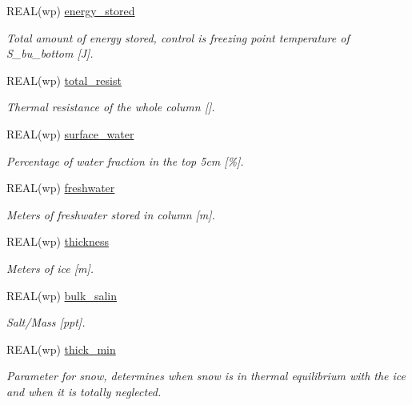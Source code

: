 \begin{DoxyCompactItemize}
REAL(wp) \hyperlink{namespacemo__data_aedd9ec4adc59bfcbf90402c4226f2f34}{energy\_\-stored}
\begin{DoxyCompactList}\small\item\em Total amount of energy stored, control is freezing point temperature of S\_\-bu\_\-bottom \mbox{[}J\mbox{]}. \item\end{DoxyCompactList}\item 
REAL(wp) \hyperlink{namespacemo__data_a71a192f5750717bc71df8f87c2a8cf52}{total\_\-resist}
\begin{DoxyCompactList}\small\item\em Thermal resistance of the whole column \mbox{[}\mbox{]}. \item\end{DoxyCompactList}\item 
REAL(wp) \hyperlink{namespacemo__data_a330cc0e4bc178ef722ccd333c69aa06d}{surface\_\-water}
\begin{DoxyCompactList}\small\item\em Percentage of water fraction in the top 5cm \mbox{[}\%\mbox{]}. \item\end{DoxyCompactList}\item 
REAL(wp) \hyperlink{namespacemo__data_a4c81fc09918e52dc51dfa99efbbac90b}{freshwater}
\begin{DoxyCompactList}\small\item\em Meters of freshwater stored in column \mbox{[}m\mbox{]}. \item\end{DoxyCompactList}\item 
REAL(wp) \hyperlink{namespacemo__data_aab72953060065beb7d6f1d2b9fcafa5c}{thickness}
\begin{DoxyCompactList}\small\item\em Meters of ice \mbox{[}m\mbox{]}. \item\end{DoxyCompactList}\item 
REAL(wp) \hyperlink{namespacemo__data_aadde2b57a3e8c60b5cd6f8a5ee72623d}{bulk\_\-salin}
\begin{DoxyCompactList}\small\item\em Salt/Mass \mbox{[}ppt\mbox{]}. \item\end{DoxyCompactList}\item 
REAL(wp) \hyperlink{namespacemo__data_a866fe962819eea1c688afb5b07109bdd}{thick\_\-min}
\begin{DoxyCompactList}\small\item\em Parameter for snow, determines when snow is in thermal equilibrium with the ice and when it is totally neglected. \item\end{DoxyCompactList}\item 

\end{DoxyCompactItemize}

